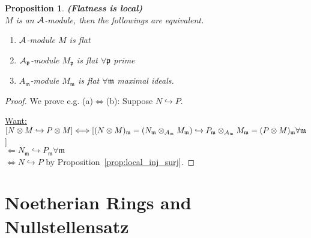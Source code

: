\documentclass[11pt]{article}
\newtheorem{prop}[thm]{Proposition}
\newcommand{\scm}{{\mathfrak m}}
\newcommand{\scp}{{\mathfrak p}}
\newcommand{\cala}{{\cal A}}
\newcommand{\Llrta}{\Longleftrightarrow}
\newcommand{\inj}{\hookrightarrow}
\begin{document}
\begin{prop}
\textbf{(Flatness is local)}\\
$M$ is an $\cala$-module, then the followings are equivalent.
\begin{enumerate}[label=(\alph*)]
\item $\cala$-module $M$ is flat
\item $\cala_\scp$-module $M_\scp$ is flat $\forall \scp$ prime
\item $A_\scm$-module $M_\scm$ is flat $\forall \scm$ maximal ideals.
\end{enumerate}
\end{prop}
\begin{proof}We prove e.g. 
(a)$\Llrta$(b): Suppose $N\inj P$.

\underline{Want:} $[N\otimes M\inj P\otimes M]\Llrta [(N\otimes M)_\scm=(N_\scm\otimes_{\cala_\scm}M_\scm)\inj P_\scm\otimes_{\cala_\scm} M_\scm= (P\otimes M)_\scm\forall \scm$ ]\\
$\Longleftarrow N_\scm\inj P_\scm\forall \scm$\\
$\Llrta N\inj P$ by Proposition~\ref{prop:local_inj_surj}.
\end{proof}
\section{Noetherian Rings and Nullstellensatz}
\end{document}
